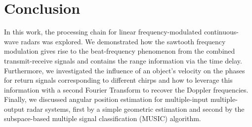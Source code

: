 \chapter{Conclusion}
In this work, the processing chain for linear frequency-modulated 
continuous-wave radars was explored. We demonstrated how the sawtooth frequency modulation
gives rise to the beat-frequency phenomenon from the combined transmit-receive
signals and contains the range information via the time delay. Furthermore, we
investigated the influence of an object's velocity on the phases for return
signals corresponding to different chirps and how to leverage this information
with a second Fourier Transform to recover the Doppler frequencies. Finally, we
discussed angular position estimation for multiple-input multiple-output radar
systems, first by a simple geometric estimation and second by the
subspace-based multiple signal classification (MUSIC) algorithm. 
